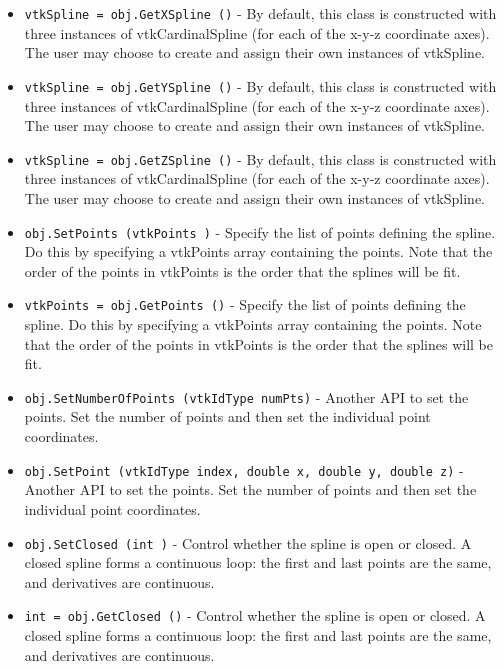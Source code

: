 \begin{itemize}
\item  \verb|vtkSpline = obj.GetXSpline ()| -  By default, this class is constructed with three instances of
 vtkCardinalSpline (for each of the x-y-z coordinate axes). The user may
 choose to create and assign their own instances of vtkSpline.

\item  \verb|vtkSpline = obj.GetYSpline ()| -  By default, this class is constructed with three instances of
 vtkCardinalSpline (for each of the x-y-z coordinate axes). The user may
 choose to create and assign their own instances of vtkSpline.

\item  \verb|vtkSpline = obj.GetZSpline ()| -  By default, this class is constructed with three instances of
 vtkCardinalSpline (for each of the x-y-z coordinate axes). The user may
 choose to create and assign their own instances of vtkSpline.

\item  \verb|obj.SetPoints (vtkPoints )| -  Specify the list of points defining the spline. Do this by 
 specifying a vtkPoints array containing the points. Note that
 the order of the points in vtkPoints is the order that the
 splines will be fit.

\item  \verb|vtkPoints = obj.GetPoints ()| -  Specify the list of points defining the spline. Do this by 
 specifying a vtkPoints array containing the points. Note that
 the order of the points in vtkPoints is the order that the
 splines will be fit.

\item  \verb|obj.SetNumberOfPoints (vtkIdType numPts)| -  Another API to set the points. Set the number of points and then set the
 individual point coordinates.

\item  \verb|obj.SetPoint (vtkIdType index, double x, double y, double z)| -  Another API to set the points. Set the number of points and then set the
 individual point coordinates.

\item  \verb|obj.SetClosed (int )| -  Control whether the spline is open or closed. A closed spline forms
 a continuous loop: the first and last points are the same, and
 derivatives are continuous.

\item  \verb|int = obj.GetClosed ()| -  Control whether the spline is open or closed. A closed spline forms
 a continuous loop: the first and last points are the same, and
 derivatives are continuous.


\end{itemize}
